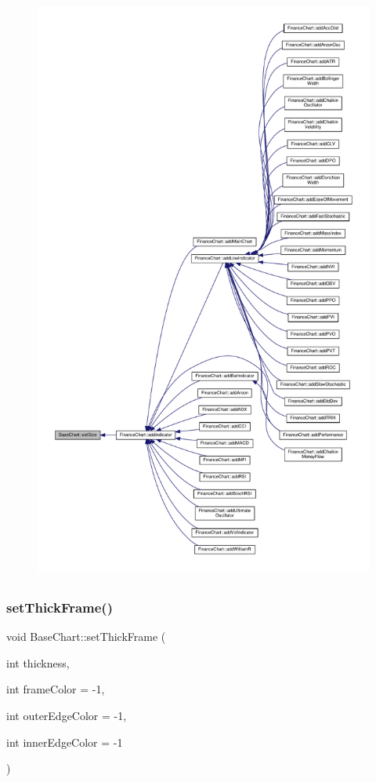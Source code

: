 \begin{figure}[H]
\begin{center}
\leavevmode
\includegraphics[height=550pt]{class_base_chart_a094bfc84860d6671e638ccd2c96bd364_icgraph}
\end{center}
\end{figure}
\mbox{\label{class_base_chart_a204e0280f39dae0edc41b9b89b412131}} 
\subsubsection{\texorpdfstring{set\+Thick\+Frame()}{setThickFrame()}}
{\footnotesize\ttfamily void Base\+Chart\+::set\+Thick\+Frame (\begin{DoxyParamCaption}\item[{int}]{thickness,  }\item[{int}]{frame\+Color = {\ttfamily -\/1},  }\item[{int}]{outer\+Edge\+Color = {\ttfamily -\/1},  }\item[{int}]{inner\+Edge\+Color = {\ttfamily -\/1} }\end{DoxyParamCaption})\hspace{0.3cm}{\ttfamily [inline]}}




